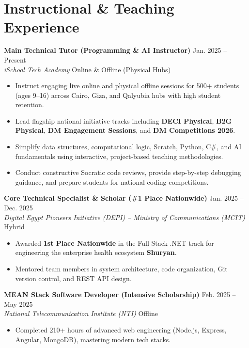\documentclass[11pt,a4paper]{article}
\begin{document}
\section{Instructional \& Teaching Experience}

\textbf{Main Technical Tutor (Programming \& AI Instructor)} \hfill Jan. 2025 -- Present \\
\textit{iSchool Tech Academy} \hfill Online \& Offline (Physical Hubs)
\begin{itemize}[leftmargin=*, nosep]
    \item Instruct engaging live online and physical offline sessions for 500+ students (ages 9--16) across Cairo, Giza, and Qalyubia hubs with high student retention.
    \item Lead flagship national initiative tracks including \textbf{DECI Physical}, \textbf{B2G Physical}, \textbf{DM Engagement Sessions}, and \textbf{DM Competitions 2026}.
    \item Simplify data structures, computational logic, Scratch, Python, C\#, and AI fundamentals using interactive, project-based teaching methodologies.
    \item Conduct constructive Socratic code reviews, provide step-by-step debugging guidance, and prepare students for national coding competitions.
\end{itemize}

\textbf{Core Technical Specialist \& Scholar (\#1 Place Nationwide)} \hfill Jan. 2025 -- Dec. 2025 \\
\textit{Digital Egypt Pioneers Initiative (DEPI) -- Ministry of Communications (MCIT)} \hfill Hybrid
\begin{itemize}[leftmargin=*, nosep]
    \item Awarded \textbf{1st Place Nationwide} in the Full Stack .NET track for engineering the enterprise health ecosystem \textbf{Shuryan}.
    \item Mentored team members in system architecture, code organization, Git version control, and REST API design.
\end{itemize}

\textbf{MEAN Stack Software Developer (Intensive Scholarship)} \hfill Feb. 2025 -- May 2025 \\
\textit{National Telecommunication Institute (NTI)} \hfill Offline
\begin{itemize}[leftmargin=*, nosep]
    \item Completed 210+ hours of advanced web engineering (Node.js, Express, Angular, MongoDB), mastering modern tech stacks.
\end{itemize}
\end{document}
